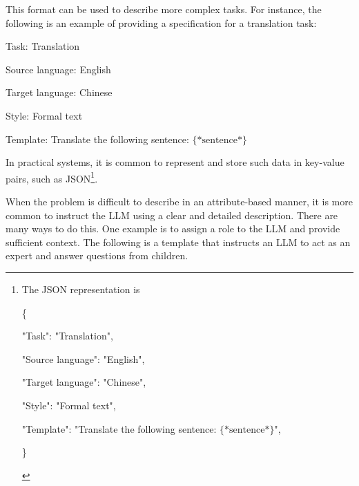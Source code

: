 This format can be used to describe more complex tasks. For instance, the following is an example of providing a specification for a translation task:

\vspace{0.5em}
\begin{tcolorbox}

\hspace{2em} Task: Translation

\hspace{2em} Source language: English

\hspace{2em} Target language: Chinese

\hspace{2em} Style: Formal text

\hspace{2em} Template: Translate the following sentence: $\{*\mathrm{sentence}*\}$

\hspace{2em} \underline{\hspace{2em}}

\end{tcolorbox}
\vspace{0.5em}

\noindent In practical systems, it is common to represent and store such data in key-value pairs, such as JSON\footnote{
The JSON representation is

\vspace{0.5em}
\begin{tcolorbox}

\{

\hspace{2em} "Task": "Translation",

\hspace{2em} "Source language": "English",

\hspace{2em} "Target language": "Chinese",

\hspace{2em} "Style": "Formal text",

\hspace{2em} "Template": "Translate the following sentence: $\{*\mathrm{sentence}*\}$",

\}

\end{tcolorbox}
\vspace{0.5em}

}.

When the problem is difficult to describe in an attribute-based manner, it is more common to instruct the LLM using a clear and detailed description. There are many ways to do this. One example is to assign a role to the LLM and provide sufficient context. The following is a template that instructs an LLM to act as an expert and answer questions from children.

